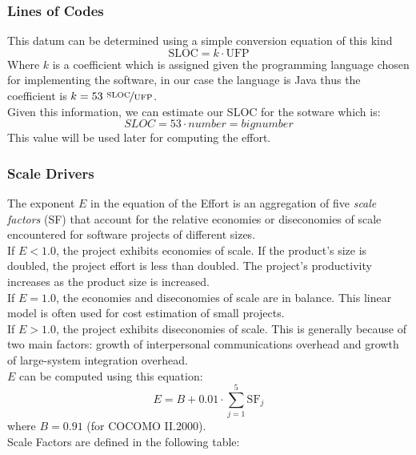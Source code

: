 \subsubsection{Lines of Codes}
This datum can be determined using a simple conversion equation of this kind
$$ \textrm{SLOC} = k \cdot \textrm{UFP} $$
Where $k$ is a coefficient which is assigned given the programming language chosen for implementing the software, in our case the language is Java thus the coefficient is $k = 53\ \nicefrac{\textrm{SLOC}}{\textrm{UFP}}$. \\
Given this information, we can estimate our SLOC for the sotware which is:
$$SLOC = 53 \cdot number = big number$$
This value will be used later for computing the effort.
\subsubsection{Scale Drivers}
The exponent $E$ in the equation of the Effort is an aggregation of five \textit{scale factors} (SF) that account
for the relative economies or diseconomies of scale encountered for software projects of different
sizes. \\
If $E < 1.0$, the project exhibits economies of scale. If the product's
size is doubled, the project effort is less than doubled. The project's productivity increases as the
product size is increased. \\
If $E = 1.0$, the economies and diseconomies of scale are in balance. This linear model is
often used for cost estimation of small projects. \\
If $E > 1.0$, the project exhibits diseconomies of scale. This is generally because of two
main factors: growth of interpersonal communications overhead and growth of large-system
integration overhead. \\
$E$ can be computed using this equation:
$$ E = B + 0.01 \cdot \sum_{j=1}^{5} \textrm{SF}_j $$
where $B = 0.91$ (for COCOMO II.2000). \\
Scale Factors are defined in the following table:
\label{sec:sd}
